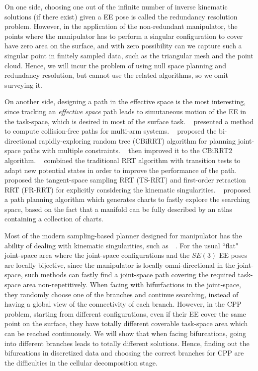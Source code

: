 \documentclass[Afour,sageh,times]{sagej}
\begin{document}
On one side, choosing one out of the infinite number of inverse kinematic solutions (if there exist) given a EE pose is called the redundancy resolution~\cite{Luck1994Global} problem. 
However, in the application of the non-redundant manipulator, the points where the manipulator has to perform a singular configuration to cover have zero area on the surface, and with zero possibility can we capture such a singular point in finitely sampled data, such as the triangular mesh and the point cloud. 
Hence, we will incur the problem of using null space planning and redundancy resolution, but cannot use the related algorithms, so we omit surveying it. 


On another side, designing a path in the effective space is the most interesting, since tracking an \textit{effective space} path leads to simutaneous motion of the EE in the task-space, which is desired in most of the surface task. 
~\cite{Gharbi2008A} presented a method to compute collision-free paths for multi-arm systems. 
~\cite{Berenson2009Manipulation} proposed the bi-directional rapidly-exploring random tree (CBiRRT) algorithm for planning joint-space paths with multiple constraints. 
~\cite{Berenson2011Task} then improved it to the CBiRRT2 algorithm. 
~\cite{Jaillet2010Sampling} combined the traditional RRT algorithm with transition tests to adapt new potential states in order to improve the performance of the path. 
~\cite{Stilman2010Global} proposed the tangent-space sampling RRT (TS-RRT) and first-order retraction RRT (FR-RRT) for explicitly considering the kinematic singularities. 
~\cite{Josep2012Randomized} proposed a path planning algorithm which generates charts to fastly explore the searching space, based on the fact that a manifold can be fully described by an atlas containing a collection of charts. 

Most of the modern sampling-based planner designed for manipulator has the ability of dealing with kinematic singularities, such as~\cite{Stilman2010Global}~\cite{Josep2012Randomized}. 
For the usual ``flat" joint-space area where the joint-space configurations and the $SE(3)$ EE poses are locally bijective, since the manipulator is locally omni-directional in the joint-space, such methods can fastly find a joint-space path covering the required task-space area non-repetitively. 
When facing with bifurfactions in the joint-space, they randomly choose one of the branches and continue searching, instead of having a global view of the connectivity of each branch. 
However, in the CPP problem, starting from different configurations, even if their EE cover the same point on the surface, they have totally different coverable task-space area which can be reached continuously. We will show that when facing bifurcations, going into different branches leads to totally different solutions. 
Hence, finding out the bifurcations in discretized data and choosing the correct branches for CPP are the difficulties in the cellular decomposition stage. 
\end{document}
